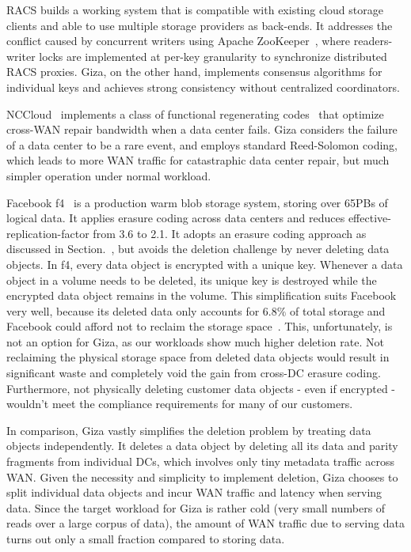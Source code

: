 RACS builds a working system that is compatible with existing cloud storage
clients and able to use multiple storage providers as back-ends.
It addresses the conflict caused by concurrent writers using Apache
ZooKeeper~\cite{zookeeper:atc10}, where readers-writer locks are implemented at
per-key granularity to synchronize distributed RACS proxies. Giza, on the other
hand, implements consensus algorithms for individual keys and achieves strong
consistency without centralized coordinators.

NCCloud~\cite{nccloud:fast12} implements a class of functional regenerating
codes~\cite{dimakis07networkcoding} that optimize cross-WAN repair bandwidth
when a data center fails. Giza considers the failure of a data center to be a
rare event, and employs standard Reed-Solomon coding, which leads to more WAN
traffic for catastraphic data center repair, but much simpler operation under
normal workload.

Facebook f4~\cite{f4:osdi14} is a production warm blob storage system, storing
over 65PBs of logical data. It applies erasure coding across data centers and
reduces effective-replication-factor from 3.6 to 2.1. It adopts an erasure
coding approach as discussed in Section.~\cite{sec:alternative}, but avoids the
deletion challenge by never deleting data objects. In f4, every data object is
encrypted with a unique key. Whenever a data object in a volume needs to be
deleted, its unique key is destroyed while the encrypted data object remains in
the volume. This simplification suits Facebook very well, because its deleted
data only accounts for $6.8\%$ of total storage and Facebook could afford not to
reclaim the storage space~\cite{f4:osdi14}. This, unfortunately, is not an
option for Giza, as our workloads show much higher deletion rate. Not reclaiming
the physical storage space from deleted data objects would result in significant
waste and completely void the gain from cross-DC erasure coding. Furthermore,
not physically deleting customer data objects - even if encrypted - wouldn't
meet the compliance requirements for many of our customers.

In comparison, Giza vastly simplifies the deletion problem by treating data
objects independently. It deletes a data object by deleting all its data and
parity fragments from individual DCs, which involves only tiny metadata traffic
across WAN. Given the necessity and simplicity to implement deletion, Giza
chooses to split individual data objects and incur WAN traffic and latency when
serving data. Since the target workload for Giza is rather cold (very small
numbers of reads over a large corpus of data), the amount of WAN traffic due to
serving data turns out only a small fraction compared to storing data.

